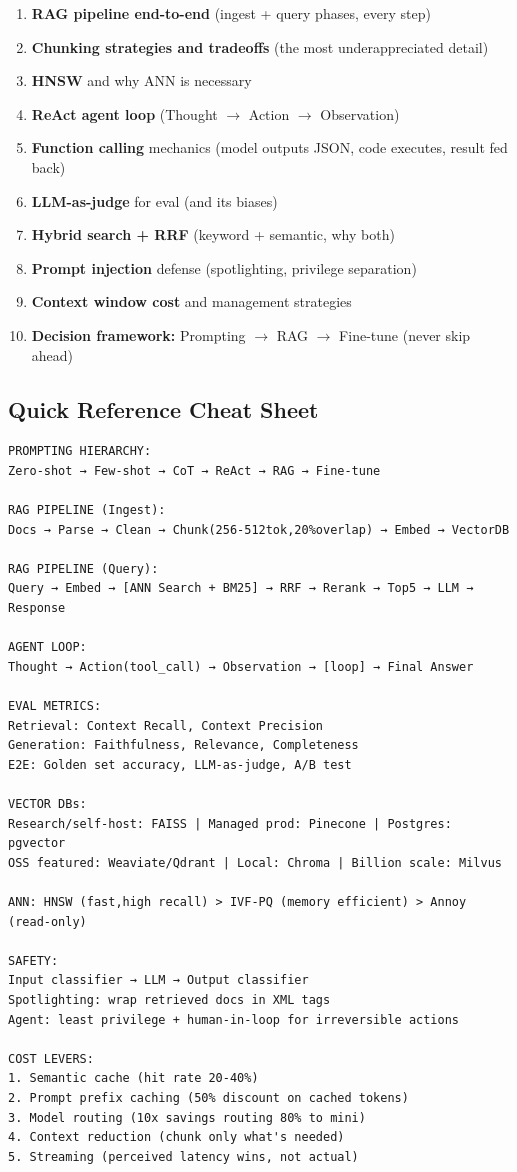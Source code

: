 \documentclass[11pt]{article}
\providecommand{\tightlist}{\setlength{\itemsep}{1pt}\setlength{\parskip}{0pt}}
\begin{document}
\begin{enumerate}
\def\labelenumi{\arabic{enumi}.}
\tightlist
\item
  \textbf{RAG pipeline end-to-end} (ingest + query phases, every step)
\item
  \textbf{Chunking strategies and tradeoffs} (the most underappreciated detail)
\item
  \textbf{HNSW} and why ANN is necessary
\item
  \textbf{ReAct agent loop} (Thought \(\rightarrow\) Action \(\rightarrow\) Observation)
\item
  \textbf{Function calling} mechanics (model outputs JSON, code executes, result fed back)
\item
  \textbf{LLM-as-judge} for eval (and its biases)
\item
  \textbf{Hybrid search + RRF} (keyword + semantic, why both)
\item
  \textbf{Prompt injection} defense (spotlighting, privilege separation)
\item
  \textbf{Context window cost} and management strategies
\item
  \textbf{Decision framework:} Prompting \(\rightarrow\) RAG \(\rightarrow\) Fine-tune (never skip ahead)
\end{enumerate}

\subsection{Quick Reference Cheat Sheet}\label{quick-reference-cheat-sheet}

\setcodelang{}

\begin{verbatim}
PROMPTING HIERARCHY:
Zero-shot → Few-shot → CoT → ReAct → RAG → Fine-tune

RAG PIPELINE (Ingest):
Docs → Parse → Clean → Chunk(256-512tok,20%overlap) → Embed → VectorDB

RAG PIPELINE (Query):
Query → Embed → [ANN Search + BM25] → RRF → Rerank → Top5 → LLM → Response

AGENT LOOP:
Thought → Action(tool_call) → Observation → [loop] → Final Answer

EVAL METRICS:
Retrieval: Context Recall, Context Precision
Generation: Faithfulness, Relevance, Completeness
E2E: Golden set accuracy, LLM-as-judge, A/B test

VECTOR DBs:
Research/self-host: FAISS | Managed prod: Pinecone | Postgres: pgvector
OSS featured: Weaviate/Qdrant | Local: Chroma | Billion scale: Milvus

ANN: HNSW (fast,high recall) > IVF-PQ (memory efficient) > Annoy (read-only)

SAFETY:
Input classifier → LLM → Output classifier
Spotlighting: wrap retrieved docs in XML tags
Agent: least privilege + human-in-loop for irreversible actions

COST LEVERS:
1. Semantic cache (hit rate 20-40%)
2. Prompt prefix caching (50% discount on cached tokens)
3. Model routing (10x savings routing 80% to mini)
4. Context reduction (chunk only what's needed)
5. Streaming (perceived latency wins, not actual)
\end{verbatim}
\end{document}
